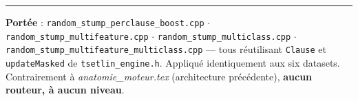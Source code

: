 \documentclass[12pt,a4paper]{article}
\newcommand{\code}[1]{\texttt{#1}}
\theoremstyle{remark}
\begin{document}
\vfill
\hrule
\vspace{0.4em}
\noindent\footnotesize
\textbf{Portée} : \code{random\_stump\_perclause\_boost.cpp} $\cdot$
\code{random\_stump\_multifeature.cpp} $\cdot$
\code{random\_stump\_multiclass.cpp} $\cdot$
\code{random\_stump\_multifeature\_multiclass.cpp} --- tous réutilisant
\code{Clause} et \code{updateMasked} de \texttt{tsetlin\_engine.h}. Appliqué
identiquement aux six datasets. Contrairement à \emph{anatomie\_moteur.tex}
(architecture précédente), \textbf{aucun routeur, à aucun niveau}.
\end{document}
